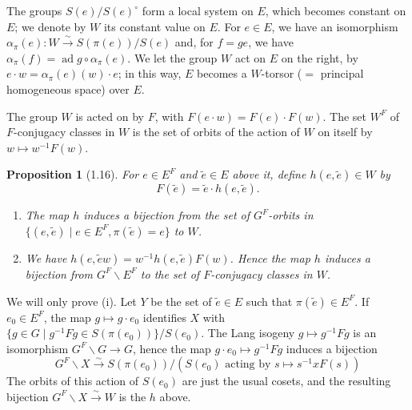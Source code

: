 \documentclass[11pt]{amsart}
\theoremstyle{plain}
\newtheorem{proposition}[theorem]{Proposition}
\theoremstyle{remark}
\DeclareMathOperator{\ad}{ad}
\begin{document}
The groups $S(e)/S(e)^\circ$ form a local system on $E$, which becomes constant on $E$; we denote by $W$ its constant value on $E$. For $e \in E$, we have an isomorphism $\alpha_\pi(e): W \xrightarrow{\sim} S(\pi(e))/S(e)$ and, for $f = ge$, we have $\alpha_\pi(f) = \ad g \circ \alpha_\pi(e)$. We let the group $W$ act on $E$ on the right, by $e \cdot w = \alpha_\pi(e)(w) \cdot e$; in this way, $E$ becomes a $W$-torsor ($=$ principal homogeneous space) over $E$.

The group $W$ is acted on by $F$, with $F(e \cdot w) = F(e) \cdot F(w)$. The set $W^F$ of $F$-conjugacy classes in $W$ is the set of orbits of the action of $W$ on itself by $w \mapsto w^{-1}F(w)$.

\begin{proposition}[1.16]
For $e \in E^F$ and $\tilde{e} \in E$ above it, define $h(e, \tilde{e}) \in W$ by
\[
F(\tilde{e}) = \tilde{e} \cdot h(e, \tilde{e}).
\]
\begin{enumerate}
\item[(i)] The map $h$ induces a bijection from the set of $G^F$-orbits in $\{(e, \tilde{e}) \mid e \in E^F, \pi(\tilde{e}) = e\}$ to $W$.
\item[(ii)] We have $h(e, \tilde{e}w) = w^{-1}h(e, \tilde{e})F(w)$. Hence the map $h$ induces a bijection from $G^F\backslash E^F$ to the set of $F$-conjugacy classes in $W$.
\end{enumerate}
\end{proposition}

We will only prove (i). Let $Y$ be the set of $\tilde{e} \in E$ such that $\pi(\tilde{e}) \in E^F$. If $e_0 \in E^F$, the map $g \mapsto g \cdot e_0$ identifies $X$ with $\{g \in G \mid g^{-1}Fg \in S(\pi(e_0))\}/S(e_0)$. The Lang isogeny $g \mapsto g^{-1}Fg$ is an isomorphism $G^F\backslash G \to G$, hence the map $g \cdot e_0 \mapsto g^{-1}Fg$ induces a bijection
\[
G^F\backslash X \xrightarrow{\sim} S(\pi(e_0))/(S(e_0) \text{ acting by } s \mapsto s^{-1}xF(s))
\]
The orbits of this action of $S(e_0)$ are just the usual cosets, and the resulting bijection $G^F\backslash X \xrightarrow{\sim} W$ is the $h$ above.
\end{document}

